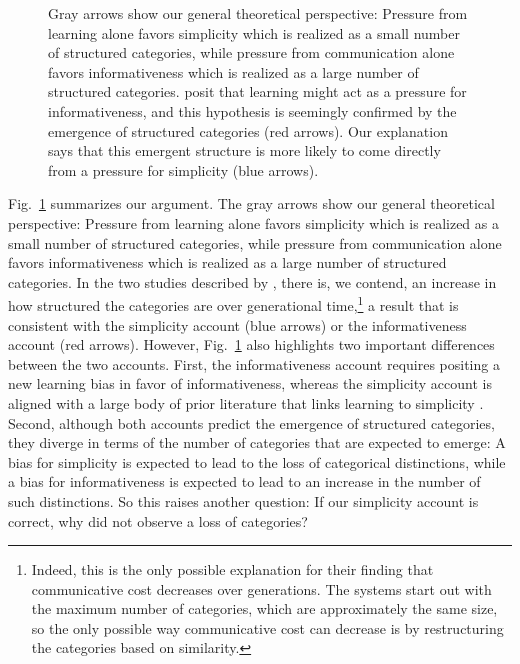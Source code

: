 \documentclass[doc,biblatex]{apa7}
\begin{document}
	\begin{figure}
	\vspace*{2pt}
	\caption{Gray arrows show our general theoretical perspective: Pressure from learning alone favors simplicity which is realized as a small number of structured categories, while pressure from communication alone favors informativeness which is realized as a large number of structured categories. \textcite{Carstensen:2015} posit that learning might act as a pressure for informativeness, and this hypothesis is seemingly confirmed by the emergence of structured categories (red arrows). Our explanation says that this emergent structure is more likely to come directly from a pressure for simplicity (blue arrows).}
	\label{fig15}
	\end{figure}

Fig.~\ref{fig15} summarizes our argument. The gray arrows show our general theoretical perspective: Pressure from learning alone favors simplicity which is realized as a small number of structured categories, while pressure from communication alone favors informativeness which is realized as a large number of structured categories. In the two studies described by \textcite{Carstensen:2015}, there is, we contend, an increase in how structured the categories are over generational time,\footnote{Indeed, this is the only possible explanation for their finding that communicative cost decreases over generations. The systems start out with the maximum number of categories, which are approximately the same size, so the only possible way communicative cost can decrease is by restructuring the categories based on similarity.} a result that is consistent with the simplicity account (blue arrows) or the informativeness account (red arrows). However, Fig.~\ref{fig15} also highlights two important differences between the two accounts. First, the informativeness account requires positing a new learning bias in favor of informativeness, whereas the simplicity account is aligned with a large body of prior literature that links learning to simplicity \parencite[e.g.,][]{Solomonoff:1964a,Li:2008,Rissanen:1978,Chater:2003,Chater:2015,Culbertson:2016,Feldman:2016,Kemp:2012}. Second, although both accounts predict the emergence of structured categories, they diverge in terms of the number of categories that are expected to emerge: A bias for simplicity is expected to lead to the loss of categorical distinctions, while a bias for informativeness is expected to lead to an increase in the number of such distinctions. So this raises another question: If our simplicity account is correct, why did \textcite{Carstensen:2015} not observe a loss of categories?
\end{document}
